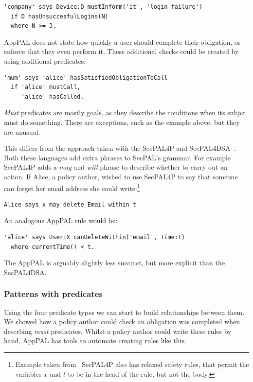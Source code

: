 \documentclass[thesis.tex]{subfiles}
\begin{document}
\begin{description}
  \begin{lstlisting}
'company' says Device:D mustInform('it', 'login-failure')
  if D hasUnsuccesfulLogins(N)
  where N >= 3.
  \end{lstlisting}

  AppPAL does not state how quickly a user should complete their obligation, or
  enforce that they even perform it.  These additional checks could be created
  by using additional predicates:

  \begin{lstlisting}
'mum' says 'alice' hasSatisfiedObligationToCall
  if 'alice' mustCall,
     'alice' hasCalled.
  \end{lstlisting}

  \emph{Must} predicates are mostly goals, as they describe the conditions when
  its subjct must do something.  There are exceptions, such as the example
  above, but they are unusual.
\end{description}


This differs from the approach taken with the SecPAL4P and SecPAL4DSA~\cite{becker_framework_2009,aziz_secpal4dsa:_2011}.
Both these languages add extra phrases to SecPAL's grammar.
For example SecPAL4P adds a \emph{may} and \emph{will} phrase to describe whether to carry out an action.
If Alice, a policy author, wished to use SecPAL4P to say that someone can forget her email address she could write:\footnote{%
Example taken from~\cite{becker_framework_2009}  SecPAL4P also has relaxed safety rules, that permit the variables $x$ and $t$ to be in the head of the rule, but not the body.}
\begin{lstlisting}
Alice says x may delete Email within t
\end{lstlisting}
An analogous AppPAL rule would be:
\begin{lstlisting}
'alice' says User:X canDeleteWithin('email', Time:t)
  where currentTime() < t.
\end{lstlisting}
The AppPAL is arguably slightly less succinct, but more explicit than the SecPAL4DSA.

\subsubsection{Patterns with predicates}

Using the four predicate types we can start to build relationships between them.
We showed how a policy author could check an obligation was completed when
descrbing \emph{must} predicates.  Whilst a policy author could write these
rules by hand, AppPAL has tools to automate creating rules like this.
\end{document}
